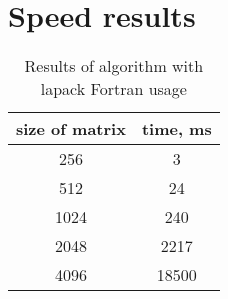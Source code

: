 \documentclass[12pt]{report}
\begin{document}
	\section{Speed results}
	\begin{table}[h!]
		\centering
		\begin{tabular}{ | c | c | }
			\hline
			size of matrix & time, ms\\  [0.5ex]
			\hline\hline
			256 & 3 \\
			\hline
			512 & 24 \\
			\hline
			1024 & 240 \\
			\hline
			2048 & 2217 \\
			\hline
			4096 & 18500 \\
			\hline
		\end{tabular}
		\caption{Results of algorithm with lapack Fortran usage}
	\end{table}
\end{document}
